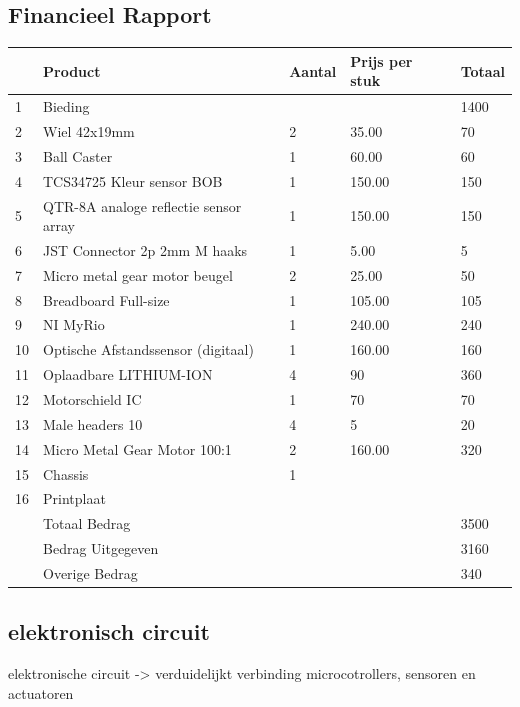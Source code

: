 \documentclass[kulak]{kulakarticle} %
\begin{document}
\subsection{Financieel Rapport}
\begin{tabular}{  l | l | l | l | l }
	
	& Product & Aantal & Prijs per stuk & Totaal  \\ \hline
	1 & Bieding & & & 1400 \\ \hline
	2 & Wiel 42x19mm & 2 & 35.00 & 70 \\ \hline
	3 & Ball Caster & 1 & 60.00 & 60   \\ \hline
	4 & TCS34725 Kleur sensor BOB  & 1 & 150.00 & 150   \\ \hline
	5 & QTR-8A analoge reflectie sensor array & 1 & 150.00 & 150 \\ \hline
	6 & JST Connector 2p 2mm M haaks & 1 & 5.00 & 5 \\ \hline	
	7 & Micro metal gear motor beugel & 2 & 25.00 & 50 \\ \hline
	8 & Breadboard Full-size & 1 & 105.00 & 105   \\ \hline
	9 & NI MyRio & 1 & 240.00 & 240 \\ \hline
	10 & Optische Afstandssensor (digitaal) & 1 & 160.00 & 160  \\ \hline
	11 & Oplaadbare LITHIUM-ION & 4 & 90 & 360 \\ \hline
	12 & Motorschield IC & 1 & 70 & 70  \\ \hline
	13 & Male headers 10 & 4 & 5 & 20   \\ \hline
	14 & Micro Metal Gear Motor 100:1 & 2 & 160.00 & 320 \\ \hline
	15 & Chassis & 1 & & \\ \hline
	16 & Printplaat & & &  \\ \hline
	& Totaal Bedrag & & & 3500\\ 
	& Bedrag Uitgegeven & & & 3160 \\ 
	& Overige Bedrag & & & 340
	
\end{tabular}
\subsection{elektronisch circuit}
elektronische circuit -> verduidelijkt verbinding microcotrollers, sensoren en actuatoren 
\end{document}

